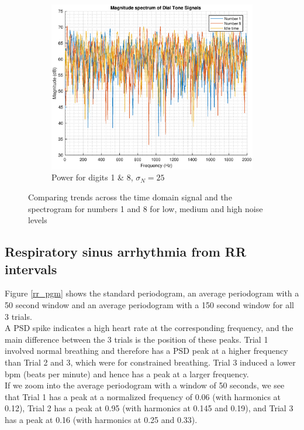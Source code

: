 \documentclass{article}
\begin{document}
\begin{figure}[h!]
\begin{subfigure}{0.32\textwidth}
\includegraphics[width = \textwidth]{dtp_magspec_n25}
\caption{Power for digits 1 \& 8, $\sigma_N=25$}
\label{fig:dtp_magspec_n25}
\end{subfigure}
\caption{Comparing trends across the time domain signal and the spectrogram for numbers 1 and 8 for low, medium and high noise levels}
\label{spectrogram}
\end{figure}

\pagebreak

\subsection{Respiratory sinus arrhythmia from RR intervals}

Figure \ref{rr_pgm} shows the standard periodogram, an average periodogram with a 50 second window and an average periodogram with a 150 second window for all 3 trials.\\

A PSD spike indicates a high heart rate at the corresponding frequency, and the main difference between the 3 trials is the position of these peaks. Trial 1 involved normal breathing and therefore has a PSD peak at a higher frequency than Trial 2 and 3, which were for constrained breathing. Trial 3 induced a lower bpm (beats per minute) and hence has a peak at a larger frequency.\\

If we zoom into the average periodogram with a window of 50 seconds, we see that Trial 1 has a peak at a normalized frequency of 0.06 (with harmonics at 0.12), Trial 2 has a peak at 0.95 (with harmonics at 0.145 and 0.19), and Trial 3 has a peak at 0.16 (with harmonics at 0.25 and 0.33).
\end{document}
